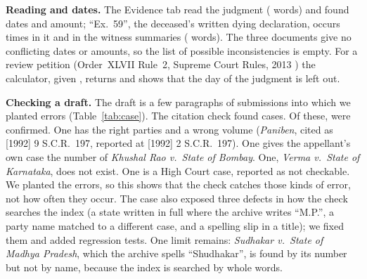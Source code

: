 \textbf{Reading and dates.} The Evidence tab read the judgment (\CaseJudgWords{} words) and found \CaseJudgDates{} dates and \CaseJudgAmounts{} amount; ``Ex.~59'', the deceased's written dying declaration, occurs \CaseJudgExhibit{} times in it and \CaseStmtExhibit{} in the witness summaries (\CaseStmtWords{} words). The three documents give no conflicting dates or amounts, so the list of possible inconsistencies is empty. For a review petition (Order~XLVII Rule~2, Supreme Court Rules, 2013 \cite{scrules}) the calculator, given \CaseLimitStart, returns \CaseLimitDate{} and shows that the day of the judgment is left out.

\textbf{Checking a draft.} The draft is a few paragraphs of submissions into which we planted errors (Table~\ref{tab:case}). The citation check found \CaseCiteFound{} cases. Of these, \CaseCiteVerified{} were confirmed. One has the right parties and a wrong volume (\emph{Paniben}, cited as [1992] 9 S.C.R.\ 197, reported at [1992] 2 S.C.R.\ 197). One gives the appellant's own case the number of \emph{Khushal Rao v.\ State of Bombay}. One, \emph{Verma v.\ State of Karnataka}, does not exist. One is a High Court case, reported as not checkable. We planted the errors, so this shows that the check catches those kinds of error, not how often they occur. The case also exposed three defects in how the check searches the index (a state written in full where the archive writes ``M.P.'', a party name matched to a different case, and a spelling slip in a title); we fixed them and added regression tests. One limit remains: \emph{Sudhakar v.\ State of Madhya Pradesh}, which the archive spells ``Shudhakar'', is found by its number but not by name, because the index is searched by whole words.

\begin{table}[t]
\caption{The draft with planted errors and what the citation check reported.}
\label{tab:case}
\centering
\footnotesize
\setlength{\tabcolsep}{3pt}

\end{table}

